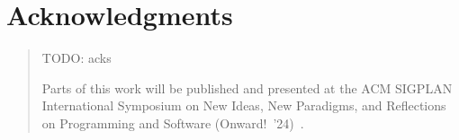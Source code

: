 
\begingroup
\let\raggedsection\centering

\chapter*{Acknowledgments}
\label{cha:acknowledgments}
\endgroup
\begin{quotation}
	\noindent TODO: acks

	\ParSep

	Parts of this work will be published and presented at the ACM SIGPLAN International Symposium on New Ideas, New Pa\-ra\-digms, and Reflections on Programming and Software (Onward!~'24)~\cite{thiede2024talking}.
\end{quotation}
